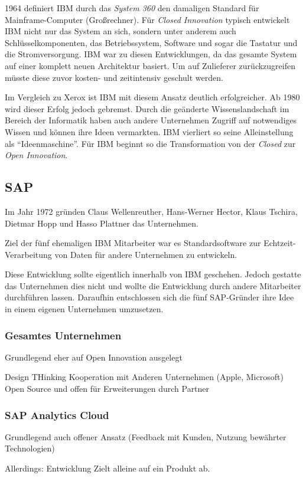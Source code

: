 1964 definiert IBM durch das \textit{System 360} den damaligen Standard für Mainframe-Computer (Großrechner).
Für \textit{Closed Innovation} typisch entwickelt IBM nicht nur das System an sich,
sondern unter anderem auch Schlüsselkomponenten, das Betriebssystem, Software und sogar die Tastatur und die Stromversorgung.
IBM war zu diesen Entwicklungen, da das gesamte System auf einer komplett neuen Architektur basiert.
Um auf Zulieferer zurückzugreifen müsste diese zuvor kosten- und zeitintensiv geschult werden.

Im Vergleich zu Xerox ist IBM mit diesem Ansatz deutlich erfolgreicher.
Ab 1980 wird dieser Erfolg jedoch gebremst.
Durch die geänderte Wissenslandschaft im Bereich der Informatik haben auch andere Unternehmen
Zugriff auf notwendiges Wissen und können ihre Ideen vermarkten.
IBM vierliert so seine Alleinstellung als \enquote{Ideenmaschine}.
Für IBM beginnt so die Transformation von der \textit{Closed} zur \textit{Open Innovation}.


\subsection{SAP}\label{sec:beispiele-sap}
Im Jahr 1972 gründen Claus Wellenreuther, Hans-Werner Hector, Klaus Tschira, Dietmar Hopp und Hasso Plattner das Unternehmen.

Ziel der fünf ehemaligen IBM Mitarbeiter war es
Standardsoftware zur Echtzeit-Verarbeitung von Daten für andere Unternehmen zu entwickeln.

Diese Entwicklung sollte eigentlich innerhalb von IBM geschehen.
Jedoch gestatte das Unternehmen dies nicht und wollte die Entwicklung durch andere Mitarbeiter durchführen lassen.
Daraufhin entschlossen sich die fünf SAP-Gründer ihre Idee in einem eigenen Unternehmen umzusetzen. \cite{SAPCompa72:online}

\subsubsection{Gesamtes Unternehmen}\label{sec:beispiele-sap-gesamt}
Grundlegend eher auf Open Innovation ausgelegt

Design THinking
Kooperation mit Anderen Unternehmen (Apple, Microsoft)
Open Source und offen für Erweiterungen durch Partner



\subsubsection{SAP Analytics Cloud}\label{sec:beispiele-sap-sac}

Grundlegend auch offener Ansatz
(Feedback mit Kunden, Nutzung bewährter Technologien)

Allerdings: Entwicklung Zielt alleine auf ein Produkt ab.
